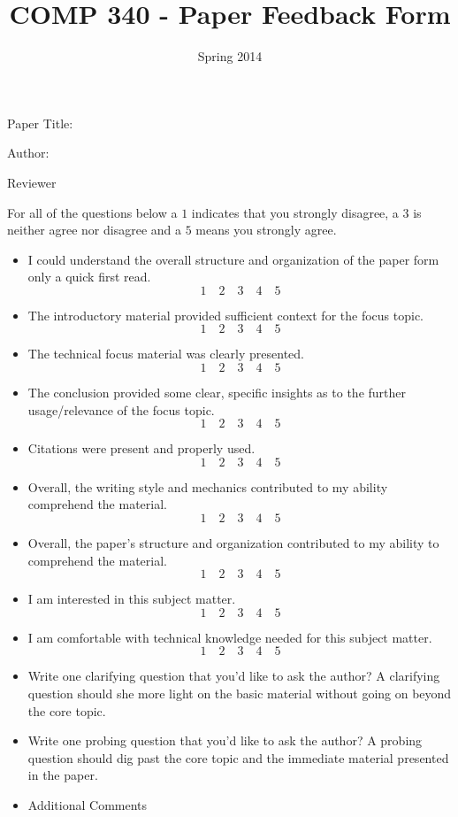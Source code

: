 \documentclass[10pt]{article}
\title{COMP 340 - Paper Feedback Form}
\author{  }
\date{Spring 2014}
\begin{document}
\maketitle 
\thispagestyle{empty}

Paper Title: \underline{\hspace{4in}}
\vspace{.2in}

Author:\underline{\hspace{4in}}
\vspace{.2in}

Reviewer\underline{\hspace{4in}}
\vspace{.1in}

For all of the questions below a $1$ indicates that you strongly disagree, a $3$ is neither agree nor disagree and a $5$ means you strongly agree.
\begin{itemize}
\item I could understand the overall structure and organization of the paper form only a quick first read.
\[ 1 \quad 2 \quad 3 \quad 4 \quad 5\]
\item The introductory material provided sufficient context for the focus topic.
\[ 1 \quad 2 \quad 3 \quad 4 \quad 5\]
\item The technical focus material was clearly presented.
\[ 1 \quad 2 \quad 3 \quad 4 \quad 5\]
\item The conclusion provided some clear, specific insights as to the further usage/relevance of the focus topic.
\[ 1 \quad 2 \quad 3 \quad 4 \quad 5\]
\item Citations were present and properly used.
\[ 1 \quad 2 \quad 3 \quad 4 \quad 5\]
\item Overall, the writing style and mechanics contributed to my ability comprehend the material.
\[ 1 \quad 2 \quad 3 \quad 4 \quad 5\]
\item Overall, the paper's structure and organization contributed to my ability to comprehend the material.
\[ 1 \quad 2 \quad 3 \quad 4 \quad 5\]
\item I am interested in this subject matter.
\[ 1 \quad 2 \quad 3 \quad 4 \quad 5\]
\item I am comfortable with technical knowledge needed for this subject matter.
\[ 1 \quad 2 \quad 3 \quad 4 \quad 5\]
\newpage \thispagestyle{empty}

\item Write one clarifying question that you'd like to ask the author? A clarifying question should she more light on the basic material without going on beyond the core topic.
\vspace{1in}
\item Write one probing question that you'd like to ask the author?  A probing question should dig past the core topic and the immediate material presented in the paper.
\vspace{1in}
\item Additional Comments
\end{itemize}
\end{document}
